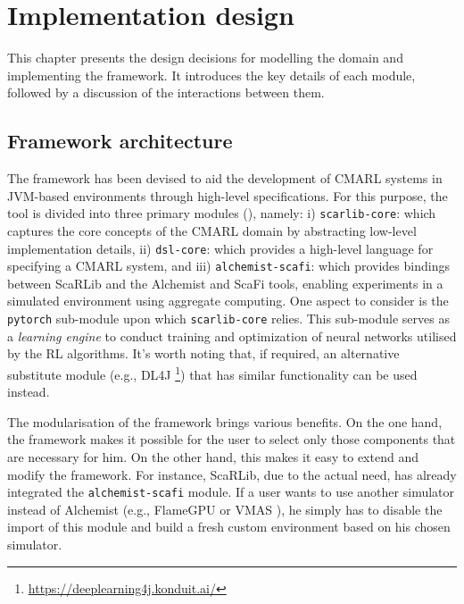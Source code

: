 \documentclass[12pt,a4paper,openright,twoside]{book}
\begin{document}
\chapter{Implementation design} 
\label{chap:impl-design}

This chapter presents the design decisions for modelling the domain and implementing 
    the framework. It introduces the key details of each module, followed by a discussion
    of the interactions between them.

\section{Framework architecture}

The framework has been devised to aid the development of CMARL systems in JVM-based environments through high-level 
    specifications. For this purpose, the tool is divided into three primary modules (), namely:
    i) \texttt{scarlib-core}:  which captures the core concepts of the CMARL domain by abstracting low-level 
        implementation details,
    ii) \texttt{dsl-core}: which provides a high-level language for specifying a CMARL system, and
    iii) \texttt{alchemist-scafi}: which provides bindings between ScaRLib and the Alchemist and ScaFi tools, enabling 
        experiments in a simulated environment using aggregate computing.
    One aspect to consider is the \texttt{pytorch} sub-module upon which \texttt{scarlib-core} relies. This sub-module serves as 
    a \emph{learning engine} to conduct training and optimization of neural networks utilised by the RL algorithms. 
    It's worth noting that, if required, an alternative substitute module (e.g., DL4J \footnote{\url{https://deeplearning4j.konduit.ai/}})
    that has similar functionality can be used instead.

The modularisation of the framework brings various benefits. On the one hand, the framework makes it possible 
    for the user to select only those components that are necessary for him. On the other hand, this makes it 
    easy to extend and modify the framework. For instance, ScaRLib, due to the actual need, has already 
    integrated the \texttt{alchemist-scafi} module. If a user wants to use another simulator instead of Alchemist 
    (e.g., FlameGPU \cite{flame} or VMAS \cite{bettini2022vmas}), he simply has to disable the import of this module and build a fresh 
    custom environment based on his chosen simulator.
\end{document}
